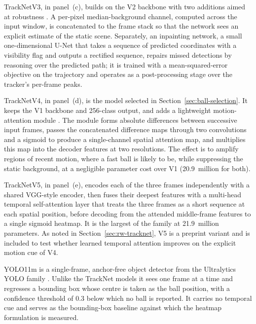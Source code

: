 TrackNetV3, in panel~(c), builds on the V2 backbone with two additions
aimed at robustness \cite{chen2023tracknetv3}. A per-pixel median-background channel,
computed across the input window, is concatenated to the frame stack so that the
network sees an explicit estimate of the static scene. Separately, an
inpainting network, a small one-dimensional U-Net that takes a sequence of
predicted coordinates with a visibility flag and outputs a rectified sequence,
repairs missed detections by reasoning over the predicted path; it is trained
with a mean-squared-error objective on the trajectory and operates as a
post-processing stage over the tracker's per-frame peaks.

TrackNetV4, in panel~(d), is the model selected in
Section~\ref{sec:ball-selection}. It keeps the V1 backbone and
256-class output, and adds a lightweight motion-attention module
\cite{raj2025tracknetv4}. The module forms absolute differences between
successive input frames, passes the concatenated difference maps through two
convolutions and a sigmoid to produce a single-channel spatial attention map,
and multiplies this map into the decoder features at two resolutions. The effect
is to amplify regions of recent motion, where a fast ball is likely to be, while
suppressing the static background, at a negligible parameter cost over V1
(20.9~million for both).

TrackNetV5, in panel~(e), encodes each of the three frames independently
with a shared
VGG-style encoder, then fuses their deepest features with a multi-head temporal
self-attention layer that treats the three frames as a short sequence at each
spatial position, before decoding from the attended middle-frame features to a
single sigmoid heatmap. It is the largest of the family at 21.9~million
parameters. As noted in Section~\ref{sec:rw-tracknet}, V5 is a preprint variant
\cite{tang2025tracknetv5} and is included to test whether learned temporal
attention improves on the explicit motion cue of V4.

YOLO11m is a single-frame, anchor-free object detector from the
Ultralytics YOLO family \cite{jocher2024yolo11, redmon2016yolo}. Unlike the
TrackNet models it sees one frame at a time and regresses a bounding box whose
centre is taken as the ball position, with a confidence threshold of 0.3 below
which no ball is reported. It carries no temporal cue and serves as the
bounding-box baseline against which the heatmap formulation is measured.

